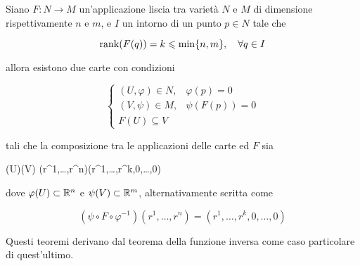 \begin{theorem}\label{thm:const-rank}
	Siano $ F : N \to M $ un'applicazione liscia tra varietà $ N $ e $ M $ di dimensione rispettivamente $ n $ e $ m $, e $ I $ un intorno di un punto $ p \in N $ tale che
	
	\begin{equation}
		\rank(F(q)) = k \leqslant \min\{n,m\} \qcomma \forall q \in I
	\end{equation}

	allora esistono due carte con condizioni
	
	\begin{equation}
		\begin{cases}
			(U,\varphi) \in N, & \varphi(p) = 0 \\
			(V,\psi) \in M, & \psi(F(p)) = 0 \\
			F(U) \subseteq V
		\end{cases}
	\end{equation}

	tali che la composizione tra le applicazioni delle carte ed $ F $ sia
	
		{\varphi(U)}{\psi(V)}
		{(r^{1},\dots,r^{n})}{(r^{1},\dots,r^{k},0,\dots,0)}

	dove $ \varphi(U) \subset \mathbb{R}^{n} $ e $ \psi(V) \subset \mathbb{R}^{m} $, alternativamente scritta come
	
	\begin{equation}
		(\psi \circ F \circ \varphi^{-1})(r^{1},\dots,r^{n}) = (r^{1},\dots,r^{k},0,\dots,0)
	\end{equation}
\end{theorem}

Questi teoremi derivano dal teorema della funzione inversa come caso particolare di quest'ultimo.

